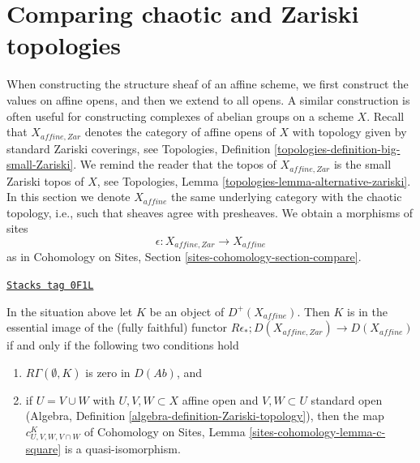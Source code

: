 \section{Comparing chaotic and Zariski topologies}
\label{etale-cohomology-section-compare-chaotic-Zariski}
When constructing the structure sheaf of an affine scheme, we first
construct the values on affine opens, and then we extend to all opens.
A similar construction is often useful for constructing complexes
of abelian groups on a scheme $X$. Recall that $X_{affine, Zar}$
denotes the category of affine opens of $X$ with topology given
by standard Zariski coverings, see
Topologies, Definition \ref{topologies-definition-big-small-Zariski}.
We remind the reader that the topos of $X_{affine, Zar}$
is the small Zariski topos of $X$, see Topologies, Lemma
\ref{topologies-lemma-alternative-zariski}.
In this section we denote $X_{affine}$ the same underlying
category with the chaotic topology, i.e., such that sheaves
agree with presheaves. We obtain a morphisms of sites
$$
\epsilon : X_{affine, Zar} \longrightarrow X_{affine}
$$
as in Cohomology on Sites, Section \ref{sites-cohomology-section-compare}.

\begin{lemma}
\label{etale-cohomology-lemma-check-zar}
\href{https://stacks.math.columbia.edu/tag/0F1L}{\texttt{Stacks tag 0F1L}}

In the situation above let $K$ be an object of $D^+(X_{affine})$.
Then $K$ is in the essential image of the (fully faithful) functor
$R\epsilon_* ; D(X_{affine, Zar}) \to D(X_{affine})$ if and only
if the following two conditions hold
\begin{enumerate}
\item $R\Gamma(\emptyset, K)$ is zero in $D(\textit{Ab})$, and
\item if $U = V \cup W$ with $U, V, W \subset X$ affine open and
$V, W \subset U$ standard open
(Algebra, Definition \ref{algebra-definition-Zariski-topology}), then
the map $c^K_{U, V, W, V \cap W}$ of
Cohomology on Sites, Lemma \ref{sites-cohomology-lemma-c-square}
is a quasi-isomorphism.
\end{enumerate}
\end{lemma}

